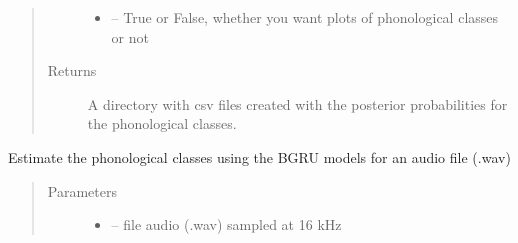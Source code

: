 \documentclass[letterpaper,10pt,english]{sphinxmanual}
\begin{document}
\begin{fulllineitems}
\begin{fulllineitems}
\begin{quote}
\begin{description}
\begin{itemize}
\item {} 
 -- True or False, whether you want plots of phonological classes or not

\end{itemize}

\item[{Returns}] \leavevmode
A directory with csv files created with the posterior probabilities for the phonological classes.

\end{description}\end{quote}

\begin{sphinxVerbatim}[commandchars=\\\{\}]
   
\PYG{p}{[}     \PYG{p}{]}
 
\end{sphinxVerbatim}

\end{fulllineitems}


\begin{fulllineitems}
\label{\detokenize{index:phonet.Phonet.get_phon_wav}}
Estimate the phonological classes using the BGRU models for an audio file (.wav)
\begin{quote}\begin{description}
\item[{Parameters}] \leavevmode\begin{itemize}
\item {} 
 -- file audio (.wav) sampled at 16 kHz


\end{itemize}
\end{description}
\end{quote}
\end{fulllineitems}
\end{fulllineitems}
\end{document}
